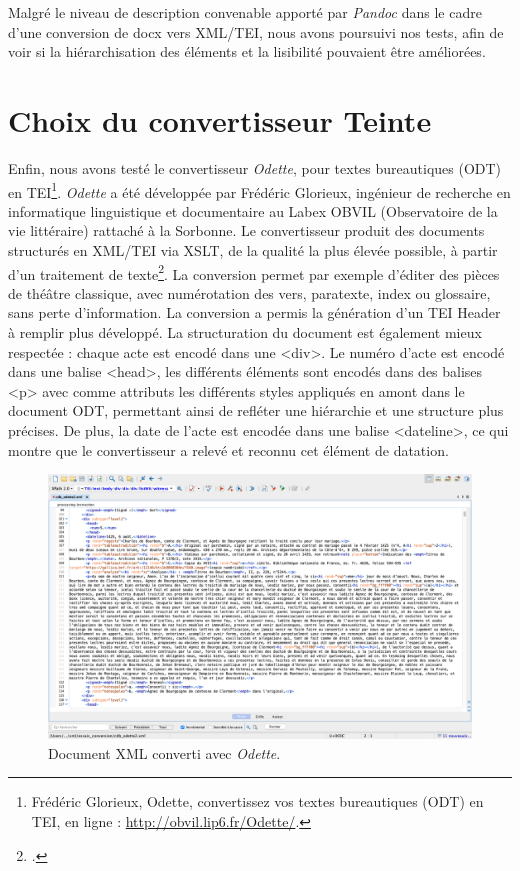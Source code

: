 \par Malgré le niveau de description convenable apporté par \textit{Pandoc} dans le cadre d’une conversion de docx vers XML/TEI, nous avons poursuivi nos tests, afin de voir si la hiérarchisation des éléments et la lisibilité pouvaient être améliorées. 

\newpage 

\section{Choix du convertisseur Teinte}
\label{II.4.3}

\par Enfin, nous avons testé le convertisseur \textit{Odette}, pour textes bureautiques (ODT) en TEI\footnote{Frédéric Glorieux, Odette, convertissez vos textes bureautiques (ODT) en TEI, en ligne : \url{http://obvil.lip6.fr/Odette/}.}. \textit{Odette} a été développée par Frédéric Glorieux, ingénieur de recherche en informatique linguistique et documentaire au Labex OBVIL (Observatoire de la vie littéraire) rattaché à la Sorbonne. Le convertisseur produit des documents structurés en XML/TEI via XSLT, de la qualité la plus élevée possible, à partir d’un traitement de texte\footnote{\cite{glorieuxTraitementTextesOdt2015}.}. La conversion permet par exemple d’éditer des pièces de théâtre classique, avec numérotation des vers, paratexte, index ou glossaire, sans perte d’information. La conversion a permis la génération d’un TEI Header à remplir plus développé. La structuration du document est également mieux respectée : chaque acte est encodé dans une <div>. Le numéro d’acte est encodé dans une balise <head>, les différents éléments sont encodés dans des balises <p> avec comme attributs les différents styles appliqués en amont dans le document ODT, permettant ainsi de refléter une hiérarchie et une structure plus précises. De plus, la date de l’acte est encodée dans une balise <dateline>, ce qui montre que le convertisseur a relevé et reconnu cet élément de datation.
\newline 

\begin{figure}[ht!]
    \centering
    \includegraphics[scale=0.31]{front/images/odette.png}
    \caption{Document XML converti avec \textit{Odette}.}
    \label{fig:odette}
\end{figure}

